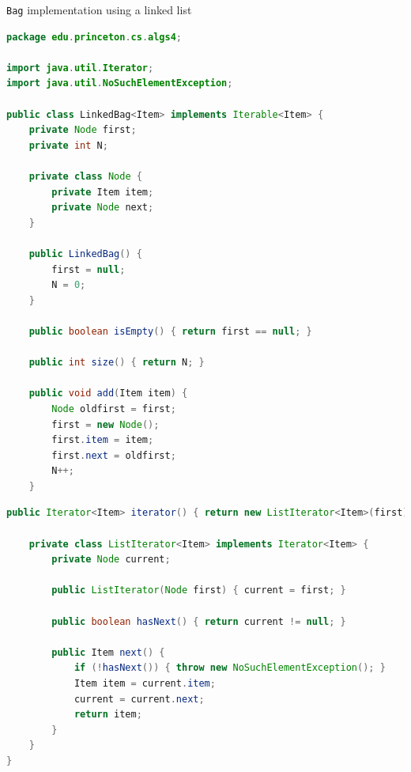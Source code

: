 \documentclass[8pt,a4paper,compress]{beamer}
\begin{document}
\begin{frame}[fragile]
\pause

\lstinline{Bag} implementation using a linked list
\begin{lstlisting}[language=Java]
package edu.princeton.cs.algs4;

import java.util.Iterator;
import java.util.NoSuchElementException;

public class LinkedBag<Item> implements Iterable<Item> {
    private Node first;
    private int N;

    private class Node {
        private Item item;
        private Node next;
    }

    public LinkedBag() {
        first = null;
        N = 0;
    }

    public boolean isEmpty() { return first == null; }

    public int size() { return N; }

    public void add(Item item) {
        Node oldfirst = first;
        first = new Node();
        first.item = item;
        first.next = oldfirst;
        N++;
    }
\end{lstlisting}
\end{frame}

\begin{frame}[fragile]
\pause

\begin{lstlisting}[language=Java]
    public Iterator<Item> iterator() { return new ListIterator<Item>(first); }

    private class ListIterator<Item> implements Iterator<Item> {
        private Node current;

        public ListIterator(Node first) { current = first; }

        public boolean hasNext() { return current != null; }

        public Item next() {
            if (!hasNext()) { throw new NoSuchElementException(); }
            Item item = current.item;
            current = current.next; 
            return item;
        }
    }
}
\end{lstlisting}
\end{frame}
\end{document}
